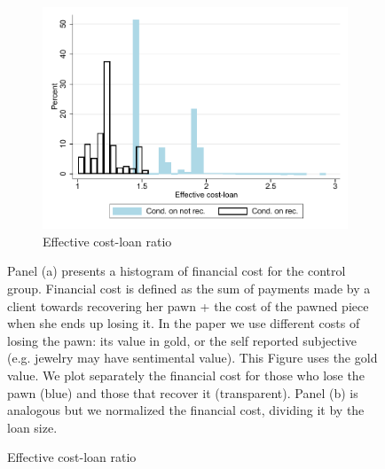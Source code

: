 \documentclass[oneside,11pt]{article}
\begin{document}
\begin{figure}[H]
\begin{center}
\begin{subfigure}{0.45\textwidth}
    \caption{Effective cost-loan ratio}
       \centering
      \includegraphics[width=\textwidth]{Figuras/hist_eff.pdf}
    \end{subfigure}
    \end{center}
         \scriptsize
         Panel (a) presents a histogram of financial cost for the control group. Financial cost is defined as the sum of payments made by a client towards recovering her pawn + the cost of the pawned piece when she ends up losing it. In the paper we use different costs of losing the pawn: its value in gold, or the self reported subjective (e.g. jewelry may have sentimental value). This Figure uses the gold value. We plot separately the financial cost for those who lose the pawn (blue) and those that recover it (transparent).  Panel (b) is analogous but we normalized the financial cost, dividing it by the loan size.  %
\end{figure}
\end{document}
